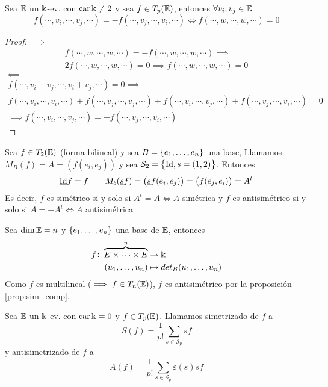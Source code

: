 \begin{prop}
    Sea $\mathbb{E}$ un $\Bbbk$-ev. con $\operatorname{car} \Bbbk \neq 2$ y sea $f \in T_p(\mathbb{E})$, entonces $\forall v_i, v_j \in \mathbb{E}$
    \[
        f(\cdots, v_i, \cdots, v_j, \cdots) = -f(\cdots,v_j,\cdots,v_i,\cdots) \iff
        f(\cdots, w, \cdots, w, \cdots) = 0
    \]
\end{prop}
\begin{proof}
    $\implies$
    \begin{gather*}
        f(\cdots,w,\cdots,w,\cdots) = - f(\cdots,w,\cdots,w,\cdots) \implies \\
        2f(\cdots,w,\cdots,w,\cdots) = 0 \implies f(\cdots,w,\cdots,w,\cdots) = 0
    \end{gather*}
    $\impliedby$
    \begin{gather*}
        f(\cdots, v_i+v_j, \cdots, v_i+v_j, \cdots) = 0 \implies \\
        f(\cdots,v_i,\cdots,v_i,\cdots) + f(\cdots,v_j,\cdots,v_j,\cdots) +
        f(\cdots,v_i,\cdots,v_j,\cdots) + f(\cdots,v_j,\cdots,v_i,\cdots) = 0 \\
        \implies f(\cdots,v_i,\cdots,v_j,\cdots) = -f(\cdots,v_j,\cdots,v_i,\cdots)
    \end{gather*}
\end{proof}
\begin{example}
    Sea $f \in T_2(\mathbb{E})$ (forma bilineal) y sea $B = \left\{e_1,\dots,e_n\right\}$ una base,
    Llamamos $M_B(f) = A = \left( f(e_i,e_j) \right)$ y sea $\mathcal{S}_2 = \left\{\operatorname{Id}, s=(1,2)\right\}$.
    Entonces
    \[
        \underline{\operatorname{Id}}f = f \qquad M_b(\underline{s}f)= \left( \underline{s}f(e_i,e_j) \right)
        = \left( f(e_j,e_i) \right) = A^t
    \]
    Es decir, $f$ es simétrico si y solo si $A^t = A \iff A$ simétrica y $f$ es
    antisimétrico si y solo si $A = -A^t \iff A$ antisimétrica
\end{example}
\begin{example}
    Sea $\dim \mathbb{E} = n$ y $\left\{e_1,\dots,e_n\right\}$ una base de $\mathbb{E}$, entonces
    \[
        \begin{aligned}
            f \colon \overbrace{E \times \cdots \times E}^n &\to \Bbbk \\
            (u_1,\dots,u_n) &\mapsto det_B(u_1,\dots,u_n)
        \end{aligned}
    \]
    Como $f$ es multilineal ($\implies f \in T_n(\mathbb{E})$), $f$ es antisimétrico
    por la proposición \ref{prop:sim_comp}.
\end{example}
\begin{defi}
    Sea $\mathbb{E}$ un $\Bbbk$-ev. con $\operatorname{car} \Bbbk = 0$ y $f \in T_p(\mathbb{E})$. Llamamos simetrizado de $f$ a
    \[
        S(f) = \frac{1}{p!}\sum_{s \in \mathcal{S}_p} \underline{s}f
    \]
    y antisimetrizado de $f$ a
    \[
        A(f) = \frac{1}{p!}\sum_{s \in \mathcal{S}_p} \varepsilon(s)\underline{s}f
    \]
\end{defi}
